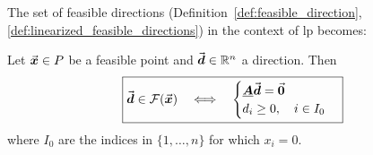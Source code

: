 The set of feasible directions (Definition~\ref{def:feasible_direction}, \ref{def:linearized_feasible_directions}) in the context of \gls{lp} becomes:
\begin{theorem}\label{thm:feasible_direction_lp}
Let \(\vec{\boldsymbol{x}} \in P\) be a feasible point and \(\vec{\boldsymbol{d}} \in \mathbb{R}^{n}\) a direction. Then
\begin{equation}\label{eq:feasible_direction_lp}
\boxed{ 
\color{black}
\vec{\boldsymbol{d}} \in \mathcal{F}(\vec{\boldsymbol{x}}) \quad \Longleftrightarrow\quad
\begin{cases}
\underline{\boldsymbol{A}}\vec{\boldsymbol{d}} = \vec{\boldsymbol{0}}\\
d_i \ge 0, \quad i \in I_{0}
\end{cases}
}
\end{equation}
where 
\(I_0\)
are the indices in \(\{1,\ldots,n\}\) for which \(x_i = 0\).
\end{theorem}

